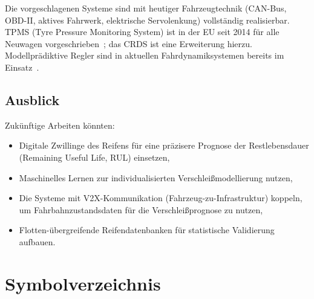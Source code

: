 ﻿\documentclass[12pt,a4paper]{article}
\theoremstyle{definition}
\theoremstyle{remark}
\begin{document}
Die vorgeschlagenen Systeme sind mit heutiger Fahrzeugtechnik (CAN-Bus,
OBD-II, aktives Fahrwerk, elektrische Servolenkung) vollständig realisierbar.
TPMS (Tyre Pressure Monitoring System) ist in der EU seit 2014 für alle
Neuwagen vorgeschrieben~\cite{EU_TPMS2009}; das CRDS ist eine Erweiterung
hierzu. Modellprädiktive Regler sind in aktuellen Fahrdynamiksystemen
bereits im Einsatz~\cite{Falcone2007}.

\subsection{Ausblick}

Zukünftige Arbeiten könnten:
\begin{itemize}
  \item Digitale Zwillinge des Reifens für eine präzisere Prognose der
        Restlebensdauer (Remaining Useful Life, RUL) einsetzen,
  \item Maschinelles Lernen zur individualisierten Verschleißmodellierung nutzen,
  \item Die Systeme mit V2X-Kommunikation (Fahrzeug-zu-Infrastruktur) koppeln,
        um Fahrbahnzustandsdaten für die Verschleißprognose zu nutzen,
  \item Flotten-übergreifende Reifendatenbanken für statistische Validierung aufbauen.
\end{itemize}

\section*{Symbolverzeichnis}
\end{document}
